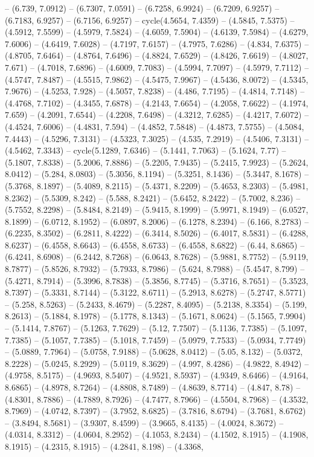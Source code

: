 -- (6.739, 7.0912) -- (6.7307, 7.0591) -- (6.7258, 6.9924) -- (6.7209, 6.9257) -- (6.7183, 6.9257) -- (6.7156, 6.9257) -- cycle(4.5654, 7.4359) -- (4.5845, 7.5375) -- (4.5912, 7.5599) -- (4.5979, 7.5824) -- (4.6059, 7.5904) -- (4.6139, 7.5984) -- (4.6279, 7.6006) -- (4.6419, 7.6028) -- (4.7197, 7.6157) -- (4.7975, 7.6286) -- (4.834, 7.6375) -- (4.8705, 7.6464) -- (4.8764, 7.6496) -- (4.8824, 7.6529) -- (4.8426, 7.6619) -- (4.8027, 7.671) -- (4.7018, 7.6896) -- (4.6009, 7.7083) -- (4.5994, 7.7097) -- (4.5979, 7.7112) -- (4.5747, 7.8487) -- (4.5515, 7.9862) -- (4.5475, 7.9967) -- (4.5436, 8.0072) -- (4.5345, 7.9676) -- (4.5253, 7.928) -- (4.5057, 7.8238) -- (4.486, 7.7195) -- (4.4814, 7.7148) -- (4.4768, 7.7102) -- (4.3455, 7.6878) -- (4.2143, 7.6654) -- (4.2058, 7.6622) -- (4.1974, 7.659) -- (4.2091, 7.6544) -- (4.2208, 7.6498) -- (4.3212, 7.6285) -- (4.4217, 7.6072) -- (4.4524, 7.6006) -- (4.4831, 7.594) -- (4.4852, 7.5848) -- (4.4873, 7.5755) -- (4.5084, 7.4443) -- (4.5296, 7.3131) -- (4.5323, 7.3025) -- (4.535, 7.2919) -- (4.5406, 7.3131) -- (4.5462, 7.3343) -- cycle(5.1289, 7.6346) -- (5.1441, 7.7063) -- (5.1624, 7.77) -- (5.1807, 7.8338) -- (5.2006, 7.8886) -- (5.2205, 7.9435) -- (5.2415, 7.9923) -- (5.2624, 8.0412) -- (5.284, 8.0803) -- (5.3056, 8.1194) -- (5.3251, 8.1436) -- (5.3447, 8.1678) -- (5.3768, 8.1897) -- (5.4089, 8.2115) -- (5.4371, 8.2209) -- (5.4653, 8.2303) -- (5.4981, 8.2362) -- (5.5309, 8.242) -- (5.588, 8.2421) -- (5.6452, 8.2422) -- (5.7002, 8.236) -- (5.7552, 8.2298) -- (5.8484, 8.2149) -- (5.9415, 8.1999) -- (5.9971, 8.1949) -- (6.0527, 8.1899) -- (6.0712, 8.1952) -- (6.0897, 8.2006) -- (6.1278, 8.2394) -- (6.166, 8.2783) -- (6.2235, 8.3502) -- (6.2811, 8.4222) -- (6.3414, 8.5026) -- (6.4017, 8.5831) -- (6.4288, 8.6237) -- (6.4558, 8.6643) -- (6.4558, 8.6733) -- (6.4558, 8.6822) -- (6.44, 8.6865) -- (6.4241, 8.6908) -- (6.2442, 8.7268) -- (6.0643, 8.7628) -- (5.9881, 8.7752) -- (5.9119, 8.7877) -- (5.8526, 8.7932) -- (5.7933, 8.7986) -- (5.624, 8.7988) -- (5.4547, 8.799) -- (5.4271, 8.7914) -- (5.3996, 8.7838) -- (5.3856, 8.7745) -- (5.3716, 8.7651) -- (5.3523, 8.7397) -- (5.3331, 8.7144) -- (5.3122, 8.6711) -- (5.2913, 8.6278) -- (5.2747, 8.5771) -- (5.258, 8.5263) -- (5.2433, 8.4679) -- (5.2287, 8.4095) -- (5.2138, 8.3354) -- (5.199, 8.2613) -- (5.1884, 8.1978) -- (5.1778, 8.1343) -- (5.1671, 8.0624) -- (5.1565, 7.9904) -- (5.1414, 7.8767) -- (5.1263, 7.7629) -- (5.12, 7.7507) -- (5.1136, 7.7385) -- (5.1097, 7.7385) -- (5.1057, 7.7385) -- (5.1018, 7.7459) -- (5.0979, 7.7533) -- (5.0934, 7.7749) -- (5.0889, 7.7964) -- (5.0758, 7.9188) -- (5.0628, 8.0412) -- (5.05, 8.132) -- (5.0372, 8.2228) -- (5.0245, 8.2929) -- (5.0119, 8.3629) -- (4.997, 8.4286) -- (4.9822, 8.4942) -- (4.9758, 8.5175) -- (4.9693, 8.5407) -- (4.9521, 8.5937) -- (4.9349, 8.6466) -- (4.9164, 8.6865) -- (4.8978, 8.7264) -- (4.8808, 8.7489) -- (4.8639, 8.7714) -- (4.847, 8.78) -- (4.8301, 8.7886) -- (4.7889, 8.7926) -- (4.7477, 8.7966) -- (4.5504, 8.7968) -- (4.3532, 8.7969) -- (4.0742, 8.7397) -- (3.7952, 8.6825) -- (3.7816, 8.6794) -- (3.7681, 8.6762) -- (3.8494, 8.5681) -- (3.9307, 8.4599) -- (3.9665, 8.4135) -- (4.0024, 8.3672) -- (4.0314, 8.3312) -- (4.0604, 8.2952) -- (4.1053, 8.2434) -- (4.1502, 8.1915) -- (4.1908, 8.1915) -- (4.2315, 8.1915) -- (4.2841, 8.198) -- (4.3368, 